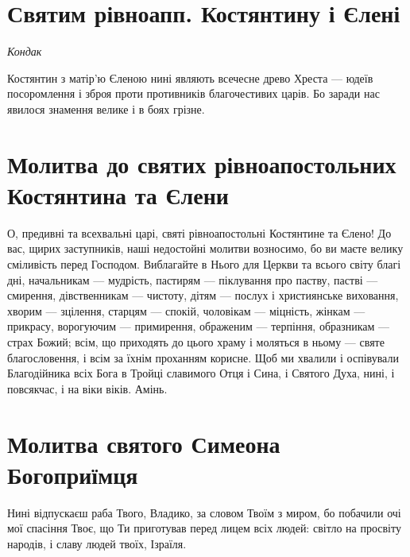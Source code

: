 \documentclass[chapters.tex]{subfiles}
\begin{document}
\section{Святим рівноапп. Костянтину і Єлені}
\emph{Кондак}

Костянтин з матір’ю Єленою нині являють всечесне древо Хреста — юдеїв посоромлення і зброя проти противників благочестивих царів. Бо заради нас явилося знамення велике і в боях грізне.

\section{Молитва до святих рівноапостольних Костянтина та Єлени}
О, предивні та всехвальні царі, святі рівноапостольні Костянтине та Єлено! До вас, щирих заступників, наші недостойні молитви возносимо, бо ви маєте велику сміливість перед Господом. Виблагайте в Нього для Церкви та всього світу благі дні, начальникам — мудрість, пастирям — піклування про паству, пастві — смирення, дівственникам — чистоту, дітям — послух і християнське виховання, хворим — зцілення, старцям — спокій, чоловікам — міцність, жінкам — прикрасу, ворогуючим — примирення, ображеним — терпіння, образникам — страх Божий; всім, що приходять до цього храму і моляться в ньому — святе благословення, і всім за їхнім проханням корисне. Щоб ми хвалили і оспівували Благодійника всіх Бога в Тройці славимого Отця і Сина, і Святого Духа, нині, і повсякчас, і на віки віків. Амінь.

\section{Молитва святого Симеона Богоприїмця}
Нині відпускаєш раба Твого, Владико, за словом Твоїм з миром, бо побачили очі мої спасіння Твоє, що Ти приготував перед лицем всіх людей: світло на просвіту народів, і славу людей твоїх, Ізраїля.
\end{document}

